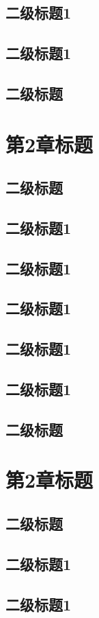 \documentclass[master,academic]{ysuthesis} %
\begin{document}
	\section{二级标题1}
	\section{二级标题1}
	\section{二级标题}
	\chapter{第2章标题}
	\section{二级标题}
	\section{二级标题1}
	\section{二级标题1}
	\section{二级标题1}
	\section{二级标题1}
	\section{二级标题1}
	\section{二级标题}
	\chapter{第2章标题}
	\section{二级标题}
	\section{二级标题1}
	\section{二级标题1}
\end{document}
